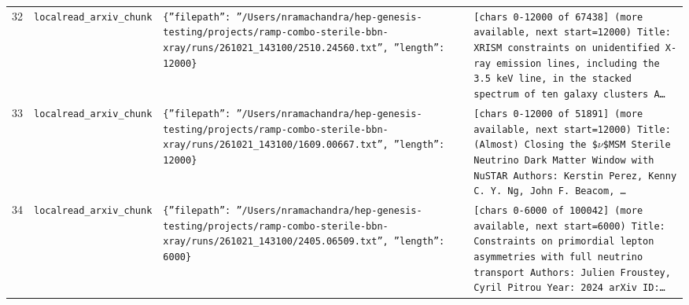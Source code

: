 \documentclass[11pt,a4paper]{article}
\begin{document}
\begin{longtable}{@{}p{}p{}p{}p{}@{}}
32 & \texttt{local}\newline\texttt{read\_\allowbreak{}arxiv\_\allowbreak{}chunk} & \texttt{\{''filepath'':\allowbreak{} ''/\allowbreak{}Users/\allowbreak{}nramachandra/\allowbreak{}hep-genesis-testing/\allowbreak{}projects/\allowbreak{}ramp-combo-sterile-bbn-xray/\allowbreak{}runs/\allowbreak{}261021\_\allowbreak{}143100/\allowbreak{}2510.24560.txt'',\allowbreak{} ''length'':\allowbreak{} 12000\}\allowbreak{}} & \texttt{[chars 0-12000 of 67438]\allowbreak{} (more available,\allowbreak{} next start=\allowbreak{}12000)\allowbreak{}  Title:\allowbreak{} XRISM constraints on unidentified X-ray emission lines,\allowbreak{} including the 3.5 keV line,\allowbreak{} in the stacked spectrum of ten galaxy clusters A\ldots{}\allowbreak{}} \\
33 & \texttt{local}\newline\texttt{read\_\allowbreak{}arxiv\_\allowbreak{}chunk} & \texttt{\{''filepath'':\allowbreak{} ''/\allowbreak{}Users/\allowbreak{}nramachandra/\allowbreak{}hep-genesis-testing/\allowbreak{}projects/\allowbreak{}ramp-combo-sterile-bbn-xray/\allowbreak{}runs/\allowbreak{}261021\_\allowbreak{}143100/\allowbreak{}1609.00667.txt'',\allowbreak{} ''length'':\allowbreak{} 12000\}\allowbreak{}} & \texttt{[chars 0-12000 of 51891]\allowbreak{} (more available,\allowbreak{} next start=\allowbreak{}12000)\allowbreak{}  Title:\allowbreak{} (Almost)\allowbreak{} Closing the \$$\nu$\$MSM Sterile Neutrino Dark Matter Window with NuSTAR Authors:\allowbreak{} Kerstin Perez,\allowbreak{} Kenny C. Y. Ng,\allowbreak{} John F. Beacom,\allowbreak{} \ldots{}\allowbreak{}} \\
34 & \texttt{local}\newline\texttt{read\_\allowbreak{}arxiv\_\allowbreak{}chunk} & \texttt{\{''filepath'':\allowbreak{} ''/\allowbreak{}Users/\allowbreak{}nramachandra/\allowbreak{}hep-genesis-testing/\allowbreak{}projects/\allowbreak{}ramp-combo-sterile-bbn-xray/\allowbreak{}runs/\allowbreak{}261021\_\allowbreak{}143100/\allowbreak{}2405.06509.txt'',\allowbreak{} ''length'':\allowbreak{} 6000\}\allowbreak{}} & \texttt{[chars 0-6000 of 100042]\allowbreak{} (more available,\allowbreak{} next start=\allowbreak{}6000)\allowbreak{}  Title:\allowbreak{} Constraints on primordial lepton asymmetries with full neutrino transport Authors:\allowbreak{} Julien Froustey,\allowbreak{} Cyril Pitrou Year:\allowbreak{} 2024 arXiv ID:\allowbreak{}\ldots{}\allowbreak{}} \\

\end{longtable}
\end{document}

